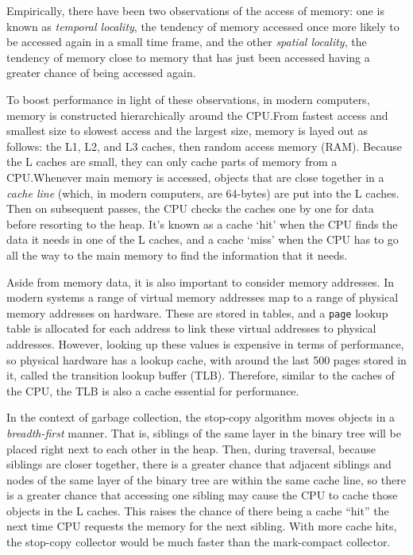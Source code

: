 \documentclass[index]{subfiles}
\begin{document}
Empirically, there have been two observations of the access of memory: one is known as \textit{temporal locality}, the tendency of memory accessed once more likely to be accessed again in a small time frame, and the other \textit{spatial locality}, the tendency of memory close to memory that has just been accessed having a greater chance of being accessed again\cite[18:21]{oracledevelopersCachingUnderstandMeasure2015}.

To boost performance in light of these observations, in modern computers, memory is constructed hierarchically\cite{simondevCanJavaScriptGo2021} around the CPU.\@ From fastest access and smallest size to slowest access and the largest size, memory is layed out as follows: the L1, L2, and L3 caches, then random access memory (RAM)\cite{simondevCanJavaScriptGo2021}. Because the L caches are small, they can only cache parts of memory from a CPU.\@ Whenever main memory is accessed, objects that are close together in a \textit{cache line} (which, in modern computers, are 64-bytes) are put into the L caches\cites{simondevCanJavaScriptGo2021}{code_project}. Then on subsequent passes, the CPU checks the caches one by one for data before resorting to the heap. It's known as a cache `hit' when the CPU finds the data it needs in one of the L caches, and a cache `miss'\cite{simondevCanJavaScriptGo2021} when the CPU has to go all the way to the main memory to find the information that it needs.

Aside from memory data, it is also important to consider memory addresses. In modern systems a range of virtual memory addresses map to a range of physical memory addresses on hardware\cites{code_project}[31:29]{oracledevelopersCachingUnderstandMeasure2015}. These are stored in tables, and a \verb+page+ lookup table is allocated for each address to link these virtual addresses to physical addresses. However, looking up these values is expensive in terms of performance, so physical hardware has a lookup cache, with around the last 500 pages stored in it, called the transition lookup buffer (TLB)\cites{code_project}[32:42]{oracledevelopersCachingUnderstandMeasure2015}. Therefore, similar to the caches of the CPU, the TLB is also a cache essential for performance.

In the context of garbage collection, the stop-copy algorithm moves objects in a \textit{breadth-first} manner. That is, siblings of the same layer in the binary tree will be placed right next to each other in the heap. Then, during traversal, because siblings are closer together, there is a greater chance that adjacent siblings and nodes of the same layer of the binary tree are within the same cache line, so there is a greater chance that accessing one sibling may cause the CPU to cache those objects in the L caches. This raises the chance of there being a cache ``hit'' the next time CPU requests the memory for the next sibling. With more cache hits, the stop-copy collector would be much faster than the mark-compact collector. %
\end{document}
